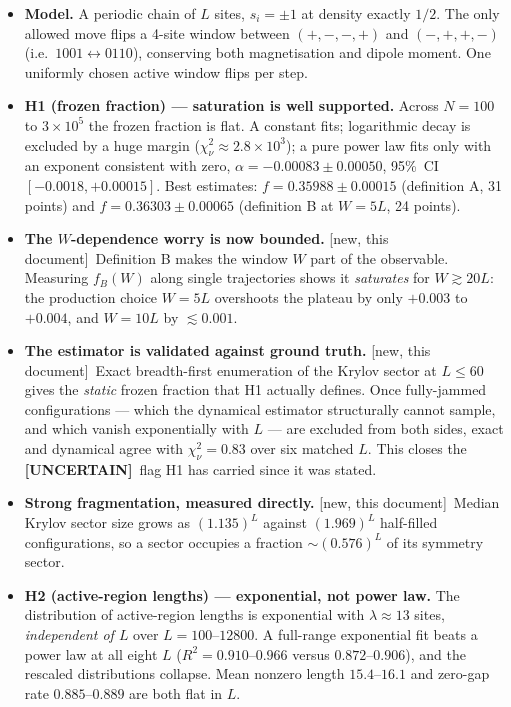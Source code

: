 \documentclass[11pt,a4paper]{article}
\newcommand{\Unc}{\textcolor{conj}{\textbf{[UNCERTAIN]}}}
\newcommand{\NEW}{\textcolor{blue!55!black}{\textsf{\small[new, this document]}}}
\begin{document}
\begin{itemize}
\item \textbf{Model.} A periodic chain of $L$ sites, $s_i=\pm1$ at density
exactly $1/2$. The only allowed move flips a 4-site window between
$(+,-,-,+)$ and $(-,+,+,-)$ (i.e.\ $1001\leftrightarrow0110$), conserving
both magnetisation and dipole moment. One uniformly chosen active window
flips per step.

\item \textbf{H1 (frozen fraction) --- saturation is well supported.}
Across $N=100$ to $3\times10^5$ the frozen fraction is flat.
A constant fits; logarithmic decay is excluded by a huge margin
($\chi^2_\nu\approx2.8\times10^3$); a pure power law fits only with an
exponent consistent with zero, $\alpha=-0.00083\pm0.00050$, 95\%~CI
$[-0.0018,+0.00015]$. Best estimates:
$f=0.35988\pm0.00015$ (definition A, 31 points) and
$f=0.36303\pm0.00065$ (definition B at $W=5L$, 24 points).

\item \textbf{The $W$-dependence worry is now bounded.} \NEW\ Definition B
makes the window $W$ part of the observable. Measuring $f_B(W)$ along
single trajectories shows it \emph{saturates} for $W\gtrsim20L$: the
production choice $W=5L$ overshoots the plateau by only
$+0.003$ to $+0.004$, and $W=10L$ by $\lesssim0.001$.

\item \textbf{The estimator is validated against ground truth.} \NEW\ Exact
breadth-first enumeration of the Krylov sector at $L\le60$ gives the
\emph{static} frozen fraction that H1 actually defines. Once
fully-jammed configurations --- which the dynamical estimator structurally
cannot sample, and which vanish exponentially with $L$ --- are excluded from
both sides, exact and dynamical agree with $\chi^2_\nu=0.83$ over six
matched $L$. This closes the \Unc\ flag H1 has carried since it was stated.

\item \textbf{Strong fragmentation, measured directly.} \NEW\ Median Krylov
sector size grows as $(1.135)^L$ against $(1.969)^L$ half-filled
configurations, so a sector occupies a fraction $\sim(0.576)^L$ of its
symmetry sector.

\item \textbf{H2 (active-region lengths) --- exponential, not power law.}
The distribution of active-region lengths is exponential with
$\lambda\approx13$ sites, \emph{independent of $L$} over
$L=100$--$12800$. A full-range exponential fit beats a power law at all
eight $L$ ($R^2=0.910$--$0.966$ versus $0.872$--$0.906$), and the rescaled
distributions collapse. Mean nonzero length $15.4$--$16.1$ and zero-gap
rate $0.885$--$0.889$ are both flat in $L$.


\end{itemize}
\end{document}
